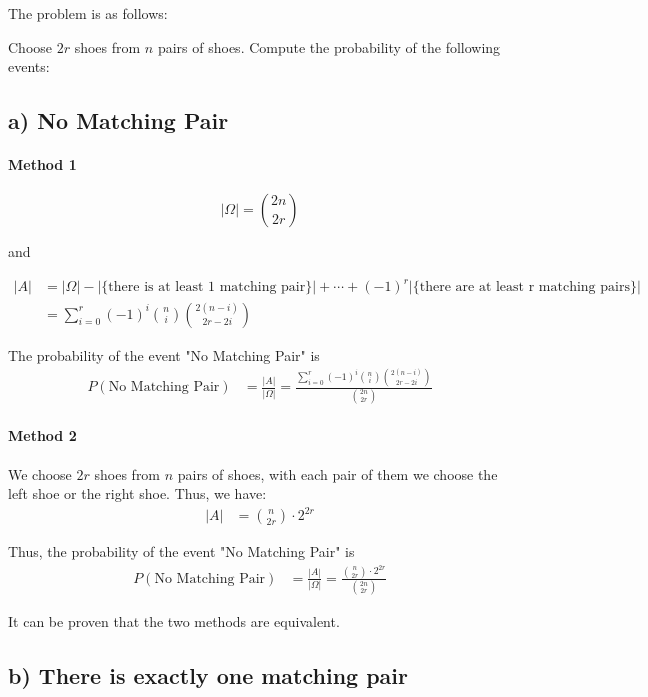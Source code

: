 \documentclass[a4paper, UTF-8]{article}
\theoremstyle{plain}
\begin{document}
The problem is as follows: 

Choose $2r$ shoes from $n$ pairs of shoes. Compute the probability of the following events:

\subsection{a) No Matching Pair}

\paragraph{Method 1}

$$
|\Omega| = \binom{2n}{2r}
$$

and 

\begin{align*}
|A| &= |\Omega| - |\{\text{there is at least 1 matching pair}\}| + \cdots + (-1)^r |\{\text{there are at least r matching pairs}\}| \\
    &= \sum_{i=0}^r (-1)^i \binom{n}{i} \binom{2(n-i)}{2r-2i}
\end{align*}

The probability of the event "No Matching Pair" is 
\begin{align*}
P(\text{No Matching Pair}) &= \frac{|A|}{|\Omega|} = \frac{\sum_{i=0}^r (-1)^i \binom{n}{i} \binom{2(n-i)}{2r-2i}}{\binom{2n}{2r}}
\end{align*}

\paragraph{Method 2} 

We choose $2r$ shoes from $n$ pairs of shoes, with each pair of them we choose the left shoe or the right shoe. Thus, we have:
\begin{align*}
|A| &= \binom{n}{2r} \cdot 2^{2r}
\end{align*}

Thus, the probability of the event "No Matching Pair" is
\begin{align*}
P(\text{No Matching Pair}) &= \frac{|A|}{|\Omega|} = \frac{\binom{n}{2r} \cdot 2^{2r}}{\binom{2n}{2r}}
\end{align*}

It can be proven that the two methods are equivalent.

\subsection{b) There is exactly one matching pair} 
\end{document}
